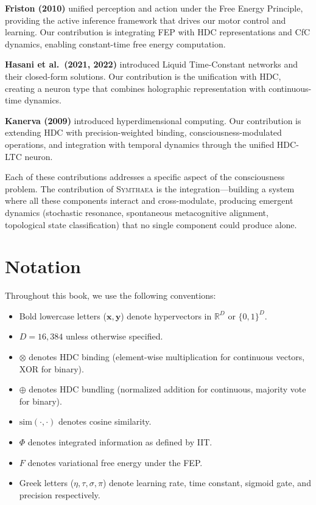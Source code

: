 \documentclass[12pt]{book}
\newcommand{\bind}{\otimes}
\newcommand{\bundle}{\oplus}
\newcommand{\symthaea}{\textsc{Symthaea}}
\newcommand{\R}{\mathbb{R}}
\begin{document}
\textbf{Friston (2010)} unified perception and action under the Free Energy Principle, providing the active inference framework that drives our motor control and learning. Our contribution is integrating FEP with HDC representations and CfC dynamics, enabling constant-time free energy computation.

\textbf{Hasani et al.\ (2021, 2022)} introduced Liquid Time-Constant networks and their closed-form solutions. Our contribution is the unification with HDC, creating a neuron type that combines holographic representation with continuous-time dynamics.

\textbf{Kanerva (2009)} introduced hyperdimensional computing. Our contribution is extending HDC with precision-weighted binding, consciousness-modulated operations, and integration with temporal dynamics through the unified HDC-LTC neuron.

Each of these contributions addresses a specific aspect of the consciousness problem. The contribution of \symthaea{} is the integration---building a system where all these components interact and cross-modulate, producing emergent dynamics (stochastic resonance, spontaneous metacognitive alignment, topological state classification) that no single component could produce alone.

\section{Notation}

Throughout this book, we use the following conventions:
\begin{itemize}
  \item Bold lowercase letters ($\mathbf{x}, \mathbf{y}$) denote hypervectors in $\R^D$ or $\{0,1\}^D$.
  \item $D = 16{,}384$ unless otherwise specified.
  \item $\bind$ denotes HDC binding (element-wise multiplication for continuous vectors, XOR for binary).
  \item $\bundle$ denotes HDC bundling (normalized addition for continuous, majority vote for binary).
  \item $\text{sim}(\cdot, \cdot)$ denotes cosine similarity.
  \item $\Phi$ denotes integrated information as defined by IIT.
  \item $F$ denotes variational free energy under the FEP.
  \item Greek letters ($\eta, \tau, \sigma, \pi$) denote learning rate, time constant, sigmoid gate, and precision respectively.
\end{itemize}
\end{document}
